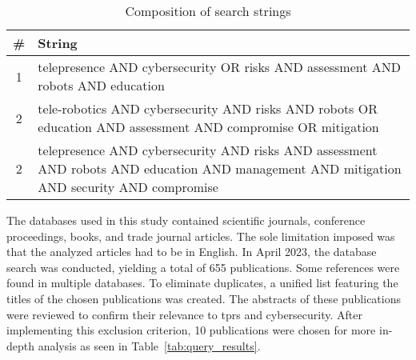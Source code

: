 \begin{table}[htb]
  \centering
  \smaller
  \caption{Composition of search strings}
  \label{tab:search_string}
  \begin{tabularx}{300pt}{|c|X|}
    \hline \textbf{\#} & \textbf{String} \\\hline
    1 & telepresence AND cybersecurity OR risks AND assessment AND robots AND
    education \\\hline
    2 & tele-robotics AND cybersecurity AND risks AND robots OR education AND
    assessment AND compromise OR mitigation \\\hline
    2 & telepresence AND cybersecurity AND risks AND assessment AND robots AND
    education AND management AND mitigation AND security AND compromise \\\hline
  \end{tabularx}
\end{table}

The databases used in this study contained scientific journals, conference proceedings, books, and trade journal articles. The sole
limitation imposed was that the analyzed articles had to be in English. In April 2023, the database search was conducted, yielding a total
of 655 publications. Some references were found in multiple databases. To eliminate duplicates, a unified list featuring the titles of
the chosen publications was created. The abstracts of these publications were reviewed to confirm their relevance to \ac{tprs} and
cybersecurity. After
implementing this exclusion criterion, 10 publications were chosen for more in-depth analysis as seen in
Table~\ref{tab:query_results}.

